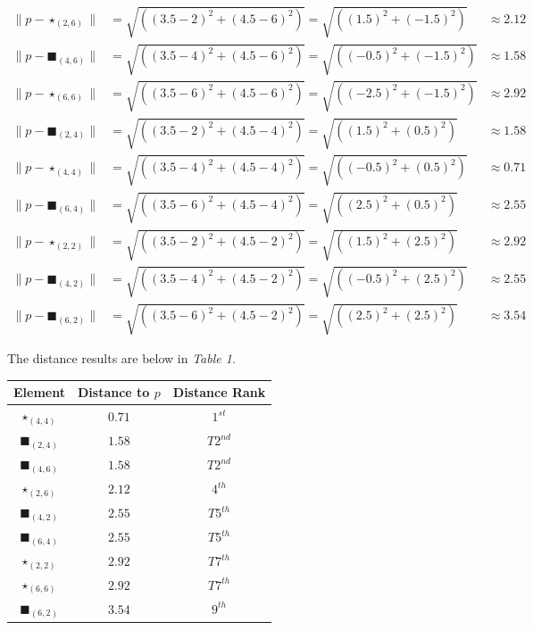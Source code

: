 \documentclass{article}
\begin{document}
\begin{align*}
\|p - \star_{(2,6)}\| &= \sqrt{\left((3.5 - 2)^2 + (4.5 - 6)^2\right)} = \sqrt{\left((1.5)^2 + (-1.5)^2\right)} &\approx 2.12 \\
\|p - \blacksquare_{(4,6)}\| &= \sqrt{\left((3.5 - 4)^2 + (4.5 - 6)^2\right)} = \sqrt{\left((-0.5)^2 + (-1.5)^2\right)} &\approx 1.58 \\
\|p - \star_{(6,6)}\| &= \sqrt{\left((3.5 - 6)^2 + (4.5 - 6)^2\right)} = \sqrt{\left((-2.5)^2 + (-1.5)^2\right)} &\approx 2.92 \\
\|p - \blacksquare_{(2,4)}\| &= \sqrt{\left((3.5 - 2)^2 + (4.5 - 4)^2\right)} = \sqrt{\left((1.5)^2 + (0.5)^2\right)} &\approx 1.58 \\
\|p - \star_{(4,4)}\| &= \sqrt{\left((3.5 - 4)^2 + (4.5 - 4)^2\right)} = \sqrt{\left((-0.5)^2 + (0.5)^2\right)} &\approx 0.71 \\
\|p - \blacksquare_{(6,4)}\| &= \sqrt{\left((3.5 - 6)^2 + (4.5 - 4)^2\right)} = \sqrt{\left((2.5)^2 + (0.5)^2\right)} &\approx 2.55 \\
\|p - \star_{(2,2)}\| &= \sqrt{\left((3.5 - 2)^2 + (4.5 - 2)^2\right)} = \sqrt{\left((1.5)^2 + (2.5)^2\right)} &\approx 2.92 \\
\|p - \blacksquare_{(4,2)}\| &= \sqrt{\left((3.5 - 4)^2 + (4.5 - 2)^2\right)} = \sqrt{\left((-0.5)^2 + (2.5)^2\right)} &\approx 2.55 \\
\|p - \blacksquare_{(6,2)}\| &= \sqrt{\left((3.5 - 6)^2 + (4.5 - 2)^2\right)} = \sqrt{\left((2.5)^2 + (2.5)^2\right)} &\approx 3.54
\end{align*}

   
The distance results are below in \textit{Table 1}.
   
\begin{center}
\begin{tabular}{|c|c|c|}
\hline
Element & Distance to $p$ & Distance Rank \\
\hline
$\star_{(4,4)}$ & $0.71$ & $1^{st}$ \\
$\blacksquare_{(2,4)}$ & $1.58$ & $T2^{nd}$ \\
$\blacksquare_{(4,6)}$ & $1.58$ & $T2^{nd}$ \\
$\star_{(2,6)}$ & $2.12$ & $4^{th}$ \\
$\blacksquare_{(4,2)}$ & $2.55$ & $T5^{th}$ \\
$\blacksquare_{(6,4)}$ & $2.55$ & $T5^{th}$ \\
$\star_{(2,2)}$ & $2.92$ & $T7^{th}$ \\
$\star_{(6,6)}$ & $2.92$ & $T7^{th}$ \\
$\blacksquare_{(6,2)}$ & $3.54$ & $9^{th}$ \\
\hline
\end{tabular}
\end{center}
\end{document}
